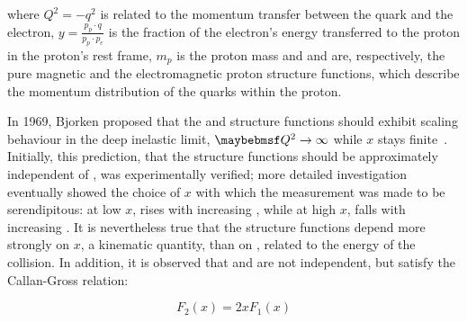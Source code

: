 
\noindent where $Q^2 = -q^2$ is related to the momentum transfer between the quark and the electron, $y = \frac{p_{p} \cdot q}{p_{p} \cdot p_{e}}$ is the fraction of the electron's energy transferred to the proton in the proton's rest frame, $m_p$ is the proton mass and  and  are, respectively, the pure magnetic and the electromagnetic proton structure functions, which describe the momentum distribution of the quarks within the proton.

In 1969, Bjorken proposed that the  and  structure functions should exhibit scaling behaviour in the deep inelastic limit, $\Qsquared \rightarrow \infty$ while $x$ stays finite~\cite{Bjorken:1969:scaling}.
Initially, this prediction, that the structure functions should be approximately independent of \Qsquared, was experimentally verified; more detailed investigation eventually showed the choice of $x$ with which the measurement was made to be serendipitous: at low $x$,  rises with increasing \Qsquared, while at high $x$,  falls with increasing \Qsquared.
It is nevertheless true that the structure functions depend more strongly on $x$, a kinematic quantity, than on \Qsquared, related to the energy of the collision.
In addition, it is observed that  and  are not independent, but satisfy the Callan-Gross relation:

\begin{equation}
  F_2(x) = 2 x F_1(x)
\end{equation}

